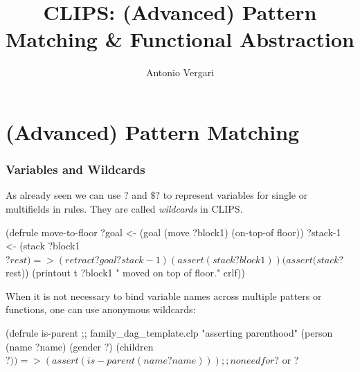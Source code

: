 \documentclass[xcolor={usenames,dvipsnames,svgnames}, compress]{beamer}
\begin{document}
\title{CLIPS:  (Advanced) Pattern Matching \& Functional Abstraction}

\author{Antonio Vergari}

\footnotesize \let\small\footnotesize





{
  \begin{frame}
    \titlepage
  \end{frame}
}





\section{(Advanced) Pattern Matching}
{
  \begin{frame}
    \sectionpage
  \end{frame}
}

\begin{frame}[fragile]
  \frametitle{Variables and Wildcards}
  As already seen we can use $?$ and $\$?$ to represent variables for
  single or multifields in rules. They are called \emph{wildcards} in CLIPS.
  \begin{clips-code}[numbers=none]
    (defrule move-to-floor
        ?goal <- (goal (move ?block1) (on-top-of floor))
        ?stack-1 <- (stack ?block1 $?rest)
        =>
        (retract ?goal ?stack-1)
        (assert (stack ?block1))
        (assert (stack $?rest))
        (printout t ?block1 " moved on top of floor." crlf))    
      \end{clips-code}

  When it is not necessary to bind variable names across multiple patters
  or functions, one can use anonymous wildcards:
  \begin{clips-code}[numbers=none]
    (defrule is-parent ;; family_dag_template.clp
        "asserting parenthood"
        (person (name ?name) (gender ?) (children $?))
        =>
        (assert (is-parent (name ?name))) ;; no need for $? or ? 
  \end{clips-code}
\end{frame}
\end{document}

